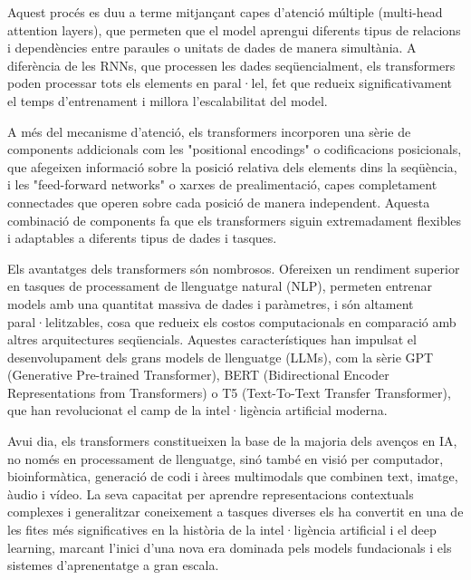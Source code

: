 \documentclass[a4paper,11pt, titlepage, twoside]{article}
\begin{document}
Aquest procés es duu a terme mitjançant capes d'atenció múltiple (multi-head attention layers), que permeten que el model aprengui diferents tipus de relacions i dependències entre paraules o unitats de dades de manera simultània. A diferència de les RNNs, que processen les dades seqüencialment, els transformers poden processar tots els elements en paral·lel, fet que redueix significativament el temps d'entrenament i millora l'escalabilitat del model.

A més del mecanisme d'atenció, els transformers incorporen una sèrie de components addicionals com les "positional encodings" o codificacions posicionals, que afegeixen informació sobre la posició relativa dels elements dins la seqüència, i les "feed-forward networks" o xarxes de prealimentació, capes completament connectades que operen sobre cada posició de manera independent. Aquesta combinació de components fa que els transformers siguin extremadament flexibles i adaptables a diferents tipus de dades i tasques.

Els avantatges dels transformers són nombrosos. Ofereixen un rendiment superior en tasques de processament de llenguatge natural (NLP), permeten entrenar models amb una quantitat massiva de dades i paràmetres, i són altament paral·lelitzables, cosa que redueix els costos computacionals en comparació amb altres arquitectures seqüencials. Aquestes característiques han impulsat el desenvolupament dels grans models de llenguatge (LLMs), com la sèrie GPT (Generative Pre-trained Transformer), BERT (Bidirectional Encoder Representations from Transformers) o T5 (Text-To-Text Transfer Transformer), que han revolucionat el camp de la intel·ligència artificial moderna.

Avui dia, els transformers constitueixen la base de la majoria dels avenços en IA, no només en processament de llenguatge, sinó també en visió per computador, bioinformàtica, generació de codi i àrees multimodals que combinen text, imatge, àudio i vídeo. La seva capacitat per aprendre representacions contextuals complexes i generalitzar coneixement a tasques diverses els ha convertit en una de les fites més significatives en la història de la intel·ligència artificial i el deep learning, marcant l'inici d'una nova era dominada pels models fundacionals i els sistemes d'aprenentatge a gran escala.
\end{document}
